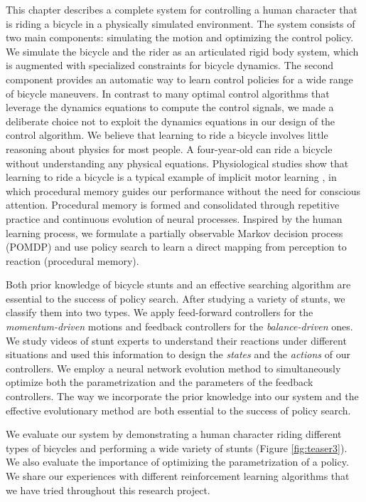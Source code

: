 This chapter describes a complete system for controlling a human character that is riding a bicycle in a physically simulated environment. The system consists of two main components: simulating the motion and optimizing the control policy. We simulate the bicycle and the rider as an articulated rigid body system, which is augmented with specialized constraints for bicycle dynamics. The second component provides an automatic way to learn control policies for a wide range of bicycle maneuvers. In contrast to many optimal control algorithms that leverage the dynamics equations to compute the control signals, we made a deliberate choice not to exploit the dynamics equations in our design of the control algorithm. We believe that learning to ride a bicycle involves little reasoning about physics for most people. A four-year-old can ride a bicycle without understanding any physical equations. Physiological studies show that learning to ride a bicycle is a typical example of implicit motor learning \cite{Chambaron2009}, in which procedural memory guides our performance without the need for conscious attention. Procedural memory is formed and consolidated through repetitive practice and continuous evolution of neural processes. Inspired by the human learning process, we formulate a partially observable Markov decision process (POMDP) and use policy search to learn a direct mapping from perception to reaction (procedural memory).

Both prior knowledge of bicycle stunts and an effective searching algorithm are essential to the success of policy search. After studying a variety of stunts, we classify them into two types. We apply feed-forward controllers for the \emph{momentum-driven} motions and feedback controllers for the \emph{balance-driven} ones. We study videos of stunt experts to understand their reactions under different situations and used this information to design the \emph{states} and the \emph{actions} of our controllers. We employ a neural network evolution method to simultaneously optimize both the parametrization and the parameters of the feedback controllers. The way we incorporate the prior knowledge into our system and the effective evolutionary method are both essential to the success of policy search.

We evaluate our system by demonstrating a human character riding different types of bicycles and performing a wide variety of stunts (Figure \ref{fig:teaser3}). We also evaluate the importance of optimizing the parametrization of a policy. We share our experiences with different reinforcement learning algorithms that we have tried throughout this research project.



